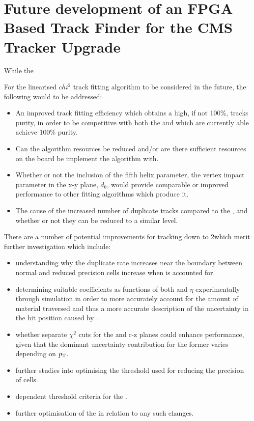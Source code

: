 \section{Future development of an FPGA Based Track Finder for the CMS Tracker Upgrade}
While the 

For the linearised $chi^{2}$ track fitting algorithm to be considered in the future, the following would to be addressed:
\begin{itemize}
\item An improved track fitting efficiency which obtains a high, if not 100\%, tracks purity, in order to be competitive with both the \KF and \LR which are currently able achieve 100\% purity.
\item Can the algorithm resources be reduced and/or are there sufficient resources on the board be implement the algorithm with.
\item Whether or not the inclusion of the fifth helix parameter, the vertex impact parameter in the x-y plane, $d_{0}$, would provide comparable or improved performance to other fitting algorithms which produce it.
\item The cause of the increased number of duplicate tracks compared to the \KF, and whether or not they can be reduced to a similar level.
\end{itemize}

There are a number of potential improvements for tracking down to 2\GeV which merit further investigation which include:
\begin{itemize}
\item understanding why the duplicate rate increases near the boundary between normal and reduced precision \HT cells increase when \MS is accounted for.
\item determining suitable coefficients as functions of both \pT and $\eta$ experimentally through simulation in order to more accurately account for the amount of material traversed and thus a more accurate description of the uncertainty in the hit position caused by \MS.
\item whether separate \KF $\chi^{2}$ cuts for the \rphi and r-z planes could enhance performance, given that the dominant uncertainty contribution for the former varies depending on $p_{\mathrm{T}}$.
\item further studies into optimising the \pT threshold used for reducing the precision of \HT cells.
\item \pt dependent threshold criteria for the \HT.
\item further optimisation of the \KF in relation to any such changes.
\end{itemize}
